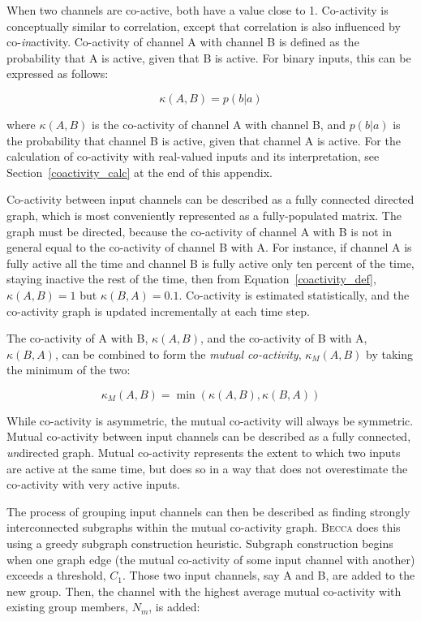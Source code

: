 When two channels are co-active, both have a value close to 1. Co-activity is conceptually similar to correlation, except that correlation is also influenced by co-{\em in}activity. Co-activity of channel A with channel B is defined as the probability that A is active, given that B is active. For binary inputs, this can be expressed as follows:

\begin{equation}
\kappa(A,B) = p(b|a)
\label{coactivity_def}
\end{equation}

where $\kappa(A,B)$ is the co-activity of channel A with channel B, and $p(b|a)$ is the probability that channel B is active, given that channel A is active. For the calculation of co-activity with real-valued inputs and its interpretation, see Section~\ref{coactivity_calc} at the end of this appendix. 

Co-activity between input channels can be described as a fully connected directed graph, which is most conveniently represented as a fully-populated matrix. The graph must be directed, because the co-activity of channel A with B is not in general equal to the co-activity of channel B with A. For instance, if channel A is fully active all the time and channel B is fully active only ten percent of the time, staying inactive the rest of the time, then from Equation~\ref{coactivity_def}, $\kappa(A,B) = 1$ but $\kappa(B,A) = 0.1$. Co-activity is estimated statistically, and the co-activity graph is updated incrementally at each time step. 

The co-activity of A with B,  $\kappa(A,B) $,  and the co-activity of B with A, $\kappa(B,A) $, can be combined to form the {\em mutual co-activity},  $\kappa_M(A,B) $ by taking the minimum of the two:

\begin{equation}
\kappa_M(A,B)   = \min(\kappa(A,B), \kappa(B,A)) 
\end{equation}

While co-activity is asymmetric, the mutual co-activity will always be symmetric. Mutual co-activity between input channels can be described as a fully connected, {\em un}directed graph. Mutual co-activity represents the extent to which two inputs are active at the same time, but does so in a way that does not overestimate the co-activity with very active inputs.

The process of grouping input channels can then be described as finding strongly interconnected subgraphs within the mutual co-activity graph. \textsc{Becca} does this using a greedy subgraph construction heuristic. Subgraph construction begins when one graph edge (the mutual co-activity of some input channel with another) exceeds a threshold, $C_1$. Those two input channels, say A and B, are added to the new group. Then, the channel with the highest average mutual co-activity with existing group members, $N_m$, is added:

